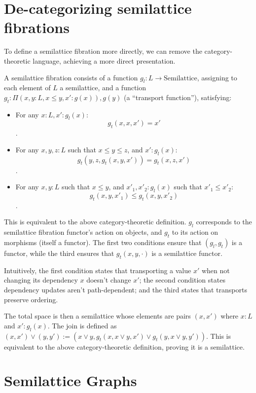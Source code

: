 \documentclass{article}
\begin{document}
    \section{De-categorizing semilattice fibrations}

      To define a semilattice fibration more directly, we can remove the category-theoretic language, achieving a more direct presentation.

      A semilattice fibration consists of a function $g_l : L \rightarrow \mathrm{Semilattice}$, assigning to each element of $L$ a semilattice, and a function $g_t : \Pi (x, y : L, x \leq y, x' : g(x)), g(y)$ (a ``transport function''), satisfying:

      \begin{itemize}
        \item For any $x : L, x' : g_l(x)$: $$g_t(x, x, x') = x'$$.
        \item For any $x, y, z : L$ such that $x \leq y \leq z$, and $x' : g_l(x)$: $$g_t(y, z, g_t(x, y, x')) = g_t(x, z, x')$$.
        \item For any $x, y : L$ such that $x \leq y$, and $x'_1, x'_2 : g_l(x)$ such that $x'_1 \leq x'_2$: $$g_t(x, y, x'_1) \leq g_t(x, y, x'_2)$$.
      \end{itemize}

      This is equivalent to the above category-theoretic definition. $g_l$ corresponds to the semilattice fibration functor's action on objects, and $g_t$ to its action on morphisms (itself a functor). The first two conditions ensure that $(g_l, g_t)$ is a functor, while the third ensures that $g_t(x, y, \cdot)$ is a semilattice functor.

      Intuitively, the first condition states that transporting a value $x'$ when not changing its dependency $x$ doesn't change $x'$; the second condition states dependency updates aren't path-dependent; and the third states that transports preserve ordering.

      The total space is then a semilattice whose elements are pairs $(x, x')$ where $x : L$ and $x' : g_l(x)$. The join is defined as $(x, x') \vee (y, y') := (x \vee y, g_t(x, x \vee y, x') \vee g_t(y, x \vee y, y'))$. This is equivalent to the above category-theoretic definition, proving it is a semilattice.

    \section{Semilattice Graphs}
\end{document}
